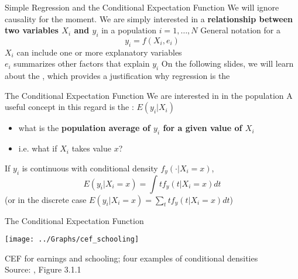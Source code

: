 



\begin{frame}{Simple Regression and the Conditional Expectation Function}
We will ignore causality for the moment. We are simply interested in a \textbf{relationship between two variables $X_i$ and $y_i$} in a population $i=1,\dots, N$
\vfill
General notation for a 
\begin{equation}
y_i=f(X_i,e_i)
\label{eq1}
\end{equation}
\vfill
$X_i$ can include one or more explanatory variables\\
$e_i$ summarizes other factors that explain $y_i$
\vfill
On the following slides, we will learn about the , which provides a justification why regression is the 


\end{frame}


\begin{frame}{The Conditional Expectation Function}
We are interested in  in the population
\vfill
A useful concept in this regard is the : $E(y_i|X_i)$
\begin{itemize}
\item what is the \textbf{population average of $y_i$ for a given value of $X_i$}
\item i.e. what if $X_i$ takes value $x$?
\end{itemize}
\vfill
If $y_i$ is continuous with conditional density $f_y(\cdot | X_i= x)$, 
\begin{equation}
E(y_i|X_i=x)=\int t f_y(t | X_i= x)dt
\label{eq2}
\end{equation}
(or in the discrete case $E(y_i|X_i=x)=\sum_t t f_y(t | X_i= x)dt$)
\end{frame}


\begin{frame}{The Conditional Expectation Function}
\begin{center}
\texttt{[image: ../Graphs/cef\_schooling]}
\end{center}
CEF for earnings and schooling; four examples of conditional densities\\
\tiny{Source: \citet{angrist_2009}, Figure 3.1.1}
\end{frame}


